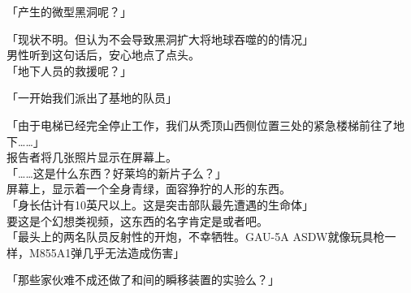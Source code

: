 「产生的微型黑洞呢？」

「现状不明。但认为不会导致黑洞扩大将地球吞噬的的情况」\\

男性听到这句话后，安心地点了点头。\\

「地下人员的救援呢？」

「一开始我们派出了基地的队员」

「由于电梯已经完全停止工作，我们从秃顶山西侧位置三处的紧急楼梯前往了地下……」\\

报告者将几张照片显示在屏幕上。\\

「……这是什么东西？好莱坞的新片子么？」\\

屏幕上，显示着一个全身青绿，面容狰狞的人形的东西。\\

「身长估计有10英尺以上。这是突击部队最先遭遇的生命体」\\

要这是个幻想类视频，这东西的名字肯定是或者吧。\\

「最头上的两名队员反射性的开炮，不幸牺牲。GAU-5A ASDW就像玩具枪一样，M855A1弹几乎无法造成伤害」

「那些家伙难不成还做了和间的瞬移装置的实验么？」\\

